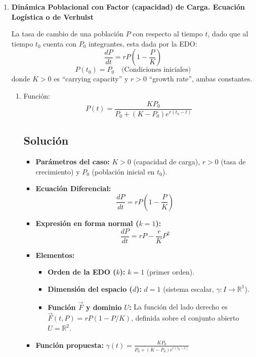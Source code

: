 \begin{enumerate}[label=\arabic*., leftmargin=*]
    \item \textbf{Dinámica Poblacional con Factor (capacidad) de Carga. Ecuación Logística o de Verhulst}
    
    La tasa de cambio de una población $P$ con respecto al tiempo $t$, dado que al tiempo $t_{0}$ cuenta con $P_{0}$ integrantes, esta dada por la EDO:
    \[ \frac{dP}{dt}=rP\left(1-\frac{P}{K}\right) \]
    \[ P(t_{0})=P_{0} \quad \text{(Condiciones iniciales)} \]
    donde $K>0$ es ``carrying capacity'' y $r>0$ ``growth rate'', ambas constantes.
    \begin{enumerate}[label=(\alph*), leftmargin=*]
        \item Función:
        \[ P(t)=\frac{KP_{0}}{P_{0}+(K-P_{0})e^{r(t_{0}-t)}} \]

        \subsection*{Solución}

        \begin{itemize}[leftmargin=*]
            \item \textbf{Parámetros del caso:} $K > 0$ (capacidad de carga), $r > 0$ (tasa de crecimiento) y $P_0$ (población inicial en $t_0$).
            
            \item \textbf{Ecuación Diferencial:}
            \[ \frac{dP}{dt} = rP\left(1 - \frac{P}{K}\right) \]
            
            \item \textbf{Expresión en forma normal ($k = 1$):}
            \[ \frac{dP}{dt} = rP - \frac{r}{K}P^2 \]
            
            \item \textbf{Elementos:}
            \begin{itemize}[leftmargin=*]
                \item \textbf{Orden de la EDO ($k$):} $k = 1$ (primer orden).
                \item \textbf{Dimensión del espacio ($d$):} $d = 1$ (sistema escalar, $\gamma: I \to \mathbb{R}^1$).
                \item \textbf{Función $\vec{F}$ y dominio $U$:} La función del lado derecho es $\vec{F}(t, P) = rP(1 - P/K)$, definida sobre el conjunto abierto $U = \mathbb{R}^2$.
            \end{itemize}
            
            \item \textbf{Función propuesta:} $\gamma(t) = \frac{K P_0}{P_0 + (K - P_0)e^{r(t_0 - t)}}$
        \end{itemize}


\end{enumerate}
\end{enumerate}
